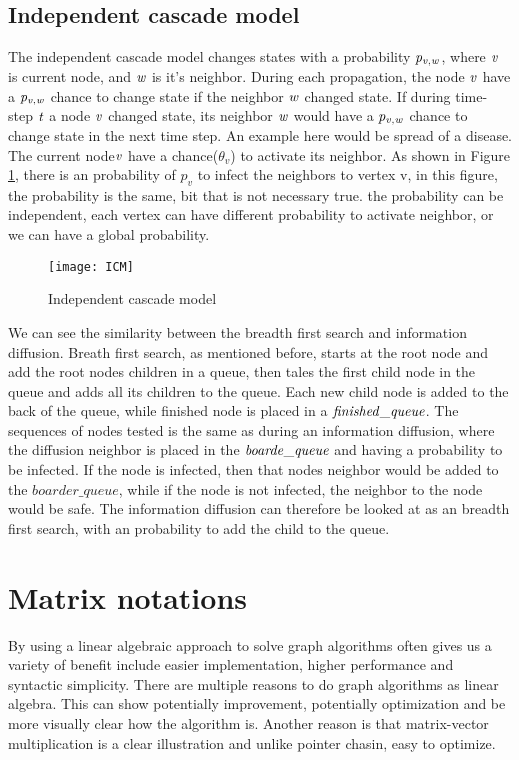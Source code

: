 {\subsection{Independent cascade model}
The independent cascade model changes states with a probability $\it{p_{v, w}}$, where $\it{ v }$ is current node, and $\it{w}$ is it's neighbor. During each propagation, the node $\it{v}$ have a  $\it{p_{v, w}}$ chance to change state if the neighbor $\it{w}$ changed state. If during time-step $\it{t}$ a node $\it{v}$ changed state, its neighbor $\it{w}$ would have a $\it{p_{v, w}}$ chance to change state in the next time step. An example here would be spread of a disease. The current node$\it{v}$ have a chance($\theta_v$) to activate its neighbor. As shown in Figure \ref{fig:ICM}, there is an probability of $p_v$ to infect the neighbors to vertex v, in this figure, the probability is the same, bit that is not necessary true. the probability can be independent, each vertex can have different probability to activate neighbor, or we can have a global probability.

\begin{figure}[!ht]
	\texttt{[image: ICM]}
	\caption{Independent cascade model} 
	\label{fig:ICM}
\end{figure}

We can see the similarity between the breadth first search and information diffusion. Breath first search, as mentioned before, starts at the root node and add the root nodes children in a queue, then tales the first child node in the queue and adds all its children to the queue. Each new child node is added to the back of the queue, while finished node is placed in a $\it{finished\_queue}$. The sequences of nodes tested is the same as during an information diffusion, where the diffusion neighbor is placed in the $ \it{boarde\_queue} $ and having a probability to be infected. If the node is infected, then that nodes neighbor would be added to the $boarder\_queue$, while if the node is not infected, the neighbor to the node would be safe. The information diffusion can therefore be looked at as an breadth first search, with an probability to add the child to the queue. 

\section{Matrix notations}
By using a linear algebraic approach to solve graph algorithms often gives us a variety of benefit include easier implementation, higher performance and syntactic simplicity\cite{MathToAlgo}. There are multiple reasons to do graph algorithms as linear algebra. This can show potentially improvement, potentially optimization and be more visually clear how the algorithm is. Another reason is that matrix-vector multiplication is a clear illustration and unlike pointer chasin, easy to optimize.  

}
